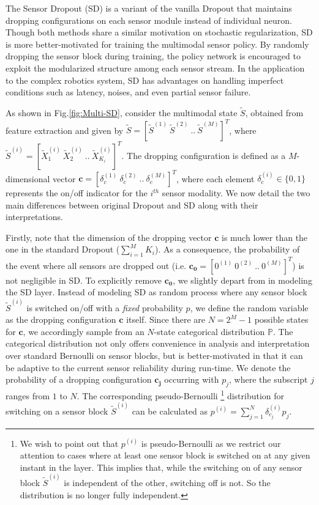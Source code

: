 \documentclass[../thesis.tex]{subfiles}
\begin{document}
The Sensor Dropout (SD) is a variant of the vanilla Dropout \cite{dropout} that maintains dropping configurations on each sensor module instead of individual neuron. Though both methods share a similar motivation on stochastic regularization, SD is more better-motivated for training the multimodal sensor policy. By randomly dropping the sensor block during training, the policy network is encouraged to exploit the modularized structure among each sensor stream. In the application to the complex robotics system, SD has advantages on handling imperfect conditions such as latency, noises, and even partial sensor failure.


As shown in Fig.\ref{fig:Multi-SD}, consider the multimodal state $\tilde{S}$, obtained from feature extraction and given by $\tilde{S}=[\tilde{S}^{(1)}~\tilde{S}^{(2)}~..~\tilde{S}^{(M)}]^T$, where $\tilde{S}^{(i)}= [\tilde{X}_1^{(i)}~\tilde{X}_2^{(i)}~..~\tilde{X}_{K_i}^{(i)}]^T$. 
The dropping configuration is defined as a $M$-dimensional vector $\mathbf{c} = [\delta_{c}^{(1)}~\delta_{c}^{(2)}~..~\delta_{c}^{(M)}]^T$, where each element $\delta_{c}^{(i)} \in \{0,1\}$ represents the on/off indicator for the $i^{th}$ sensor modality. We now detail the two main differences between original Dropout and SD along with their interpretations. 

Firstly, note that the dimension of the dropping vector $\mathbf{c}$ is much lower than the one in the standard Dropout ($\sum_{i=1}^M K_i$). As a consequence, the probability of the event where all sensors are dropped out (i.e. $\mathbf{{c_0}} = [0^{(1)}~0^{(2)}~..~0^{(M)}]^T$) is not negligible in SD. To explicitly remove $\mathbf{{c_0}}$, we slightly depart from \cite{dropout} in modeling the SD layer. Instead of modeling SD as random process where any sensor block $\tilde{S}^{(i)}$ is switched on/off with a \textit{fixed} probability $p$, we define the random variable as the dropping configuration $\mathbf{c}$ itself. Since there are $N = 2^M - 1$ possible states for $\mathbf{c}$, we accordingly sample from an $N$-state categorical distribution $\mathbb{P}$. The categorical distribution not only offers convenience in analysis and interpretation over standard Bernoulli on sensor blocks, but is better-motivated in that it can be adaptive to the current sensor reliability during run-time. We denote the probability of a dropping configuration $\mathbf{{c_j}}$ occurring with $p_j$, where the subscript $j$ ranges from $1$ to $N$. The corresponding pseudo-Bernoulli
\footnote{ 
We wish to point out that $p^{(i)}$ is pseudo-Bernoulli as we restrict our attention to cases where at least one sensor block is switched on at any given instant in the layer. This implies that, while the switching on of any sensor block $\tilde{S}^{(i)}$ is independent of the other, switching off is not. So the distribution is no longer fully independent.
}
distribution for switching on a sensor block $\tilde{S}^{(i)}$ can be calculated as $p^{(i)} = \sum_{j=1}^N\delta_{c_j}^{(i)} p_j$. 
\end{document}
